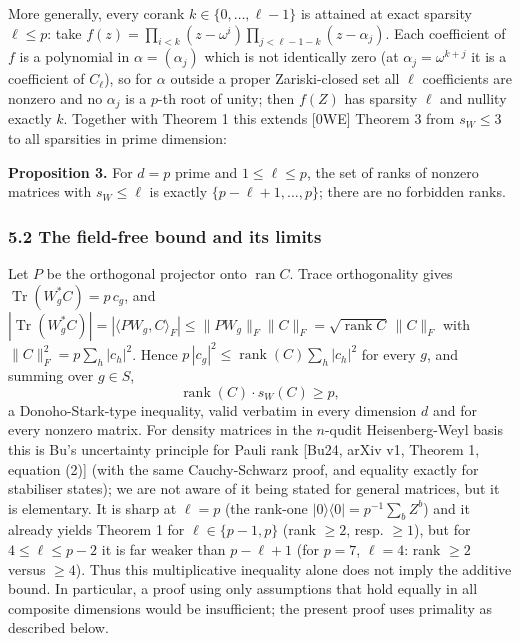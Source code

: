 \documentclass[
  11pt,
  a4paper,
]{article}
\begin{document}
More generally, every corank \(k\in\{0,\allowbreak{}\dots,\allowbreak{}\ell-1\}\) is attained at
exact sparsity \(\ell\le p\): take
\(f(z)=\prod_{i<k}(z-\omega^i)\prod_{j<\ell-1-k}(z-\alpha_j)\). Each
coefficient of \(f\) is a polynomial in \(\alpha=(\alpha_j)\) which is
not identically zero (at \(\alpha_j=\omega^{k+j}\) it is a coefficient
of \(C_\ell\)), so for \(\alpha\) outside a proper Zariski-closed set
all \(\ell\) coefficients are nonzero and no \(\alpha_j\) is a \(p\)-th
root of unity; then \(f(Z)\) has sparsity \(\ell\) and nullity exactly
\(k\). Together with Theorem 1 this extends {[}0WE{]} Theorem 3 from
\(s_W\le3\) to all sparsities in prime dimension:

\textbf{Proposition 3.} For \(d=p\) prime and \(1\le\ell\le p\), the set
of ranks of nonzero matrices with \(s_W\le\ell\) is exactly
\(\{p-\ell+1,\allowbreak{}\dots,\allowbreak{}p\}\); there are no forbidden ranks.

\subsubsection{5.2 The field-free bound and its
limits}\label{the-field-free-bound-and-its-limits}

Let \(P\) be the orthogonal projector onto \(\operatorname{ran}C\).
Trace orthogonality gives \(\operatorname{Tr}(W_g^*C)=p\,\allowbreak{}c_g\), and
\(|\operatorname{Tr}(W_g^*C)|=|\langle PW_g,\allowbreak{}C\rangle_F|\le\|PW_g\|_F\|C\|_F=\sqrt{\operatorname{rank}C}\,\allowbreak{}\|C\|_F\)
with \(\|C\|_F^2=p\sum_h|c_h|^2\). Hence
\(p\,\allowbreak{}|c_g|^2\le\operatorname{rank}(C)\sum_h|c_h|^2\) for every \(g\),
and summing over \(g\in S\),
\[\operatorname{rank}(C)\cdot s_W(C)\ge p,\] a Donoho-Stark-type
inequality, valid verbatim in every dimension \(d\) and for every
nonzero matrix. For density matrices in the \(n\)-qudit Heisenberg-Weyl
basis this is Bu's uncertainty principle for Pauli rank {[}Bu24, arXiv
v1, Theorem 1, equation (2){]} (with the same Cauchy-Schwarz proof, and
equality exactly for stabiliser states); we are not aware of it being
stated for general matrices, but it is elementary. It is sharp at
\(\ell=p\) (the rank-one \(|0\rangle\langle0|=p^{-1}\sum_bZ^b\)) and it
already yields Theorem 1 for \(\ell\in\{p-1,\allowbreak{}p\}\) (rank \(\ge2\), resp.
\(\ge1\)), but for \(4\le\ell\le p-2\) it is far weaker than
\(p-\ell+1\) (for \(p=7\), \(\ell=4\): rank \(\ge2\) versus \(\ge4\)).
Thus this multiplicative inequality alone does not imply the additive
bound. In particular, a proof using only assumptions that hold equally
in all composite dimensions would be insufficient; the present proof
uses primality as described below.
\end{document}

